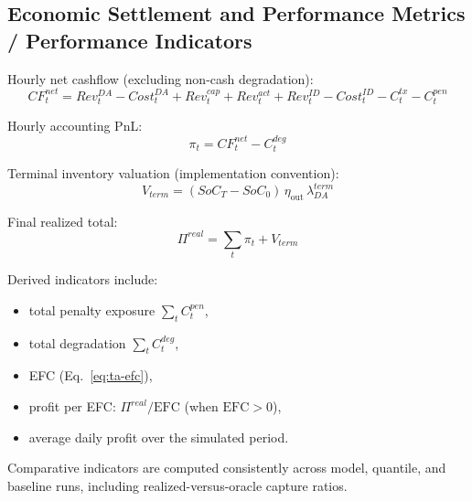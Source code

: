 \subsection{Economic Settlement and Performance Metrics / Performance Indicators}
Hourly net cashflow (excluding non-cash degradation):
\begin{equation}\label{eq:ta-cashflow}
    CF^{net}_t
    =
    Rev^{DA}_t-Cost^{DA}_t
    +Rev^{cap}_t+Rev^{act}_t
    +Rev^{ID}_t-Cost^{ID}_t
    -C^{tx}_t-C^{pen}_t
\end{equation}

Hourly accounting PnL:
\begin{equation}\label{eq:ta-pnl-hour}
    \pi_t = CF^{net}_t - C^{deg}_t
\end{equation}

Terminal inventory valuation (implementation convention):
\begin{equation}\label{eq:ta-terminal}
    V_{term}=(SoC_T-SoC_0)\,\eta_{\text{out}}\,\lambda^{term}_{DA}
\end{equation}

Final realized total:
\begin{equation}\label{eq:ta-pnl-total}
    \Pi^{real}=\sum_t \pi_t + V_{term}
\end{equation}

Derived indicators include:
\begin{itemize}
    \item total penalty exposure $\sum_t C^{pen}_t$,
    \item total degradation $\sum_t C^{deg}_t$,
    \item EFC (Eq.~\ref{eq:ta-efc}),
    \item profit per EFC: $\Pi^{real}/\mathrm{EFC}$ (when $\mathrm{EFC}>0$),
    \item average daily profit over the simulated period.
\end{itemize}

Comparative indicators are computed consistently across model, quantile, and baseline runs, including realized-versus-oracle capture ratios.
